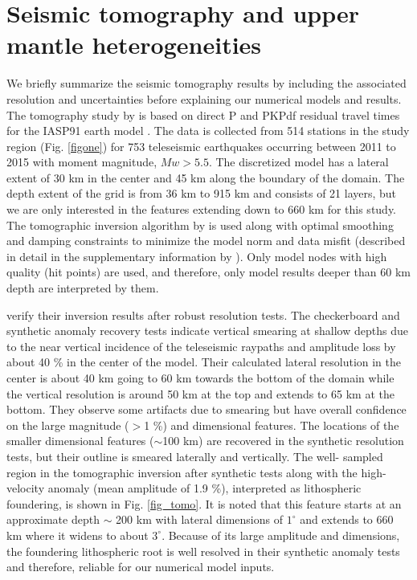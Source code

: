 \documentclass[draft,linenumbers]{agujournal2018}
\begin{document}
\section{Seismic tomography and upper mantle heterogeneities}
We briefly summarize the seismic tomography results by \citet{Biryol_2016} including the associated resolution and uncertainties before explaining our numerical models and results. The tomography study by \citet{Biryol_2016} is based on direct P and PKPdf residual travel times for the IASP91 earth model \citep{kennett1991traveltimes}. The data is collected from 514 stations in the study region (Fig. \ref{figone}) for 753 teleseismic earthquakes occurring between 2011 to 2015 with moment magnitude, $Mw > 5.5$. The discretized model has a lateral extent of 30 km in the center and 45 km along the boundary of the domain. The depth extent of the grid is from 36 km to 915 km and consists of 21 layers, but we are only interested in the features extending down to 660 km for this study. The tomographic inversion algorithm by \citet{schmandt2010seismic} is used along with optimal smoothing and damping constraints to minimize the model norm and data misfit (described in detail in the supplementary information by \citet{Biryol_2016}). Only model nodes with high quality (hit points) are used, and therefore, only model results deeper than 60 km depth are interpreted by them.
    
    \citet{Biryol_2016} verify their inversion results after robust resolution tests. The checkerboard and synthetic anomaly recovery tests indicate vertical smearing at shallow depths due to the near vertical incidence of the teleseismic raypaths and amplitude loss by about 40 \% in the center of the model. Their calculated lateral resolution in the center is about 40 km going to 60 km towards the bottom of the domain while the vertical resolution  is around 50 km at the top and extends to 65 km at the bottom. They observe some artifacts due to smearing but have overall confidence on the large magnitude ($>$1 \%) and dimensional features. The locations of the smaller dimensional features ($\sim$100 km) are recovered in the synthetic resolution tests, but their outline is smeared laterally and vertically. The well- sampled region in the tomographic inversion after synthetic tests along with the high-velocity anomaly (mean amplitude of 1.9 \%), interpreted as lithospheric foundering, is shown in Fig. \ref{fig_tomo}. It is noted that this feature starts at an approximate depth $\sim$ 200 km with lateral dimensions of $1^\circ$ and extends to 660 km where it widens to about $3^\circ$. Because of its large amplitude and dimensions, the foundering lithospheric root is well resolved in their synthetic anomaly tests and therefore, reliable for our numerical model inputs. 
\end{document}
